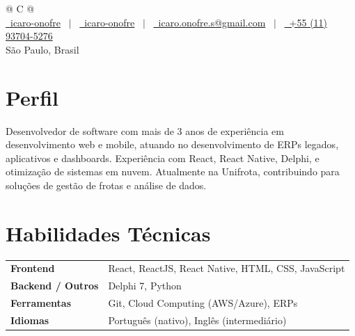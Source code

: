 \documentclass[a4paper,11pt]{article}
\begin{document}
\pagestyle{empty}

\begin{tabularx}{\linewidth}{@{} C @{}}
\fontsize{32}{38} \\[6pt]
\small
\href{https://github.com/icaro-onofre}{\raisebox{-0.05\height}\faGithub\ icaro-onofre} \
$|$ \
\href{https://linkedin.com/in/icaro-onofre}{\raisebox{-0.05\height}\faLinkedin\ icaro-onofre} \
$|$ \
\href{mailto:icaro.onofre.s@gmail.com}{\raisebox{-0.05\height}\faEnvelope\ icaro.onofre.s@gmail.com} \
$|$ \
\href{tel:+5511937045276}{\raisebox{-0.05\height}\faMobile\ +55 (11) 93704-5276} \\[4pt]
\small\color{medgray} São Paulo, Brasil
\end{tabularx}

\vspace{4pt}

\section{Perfil}

Desenvolvedor de software com mais de 3 anos de experiência em desenvolvimento web e mobile, atuando no desenvolvimento de ERPs legados, aplicativos e dashboards. Experiência com React, React Native, Delphi, e otimização de sistemas em nuvem. Atualmente na Unifrota, contribuindo para soluções de gestão de frotas e análise de dados.

\section{Habilidades Técnicas}

\begin{tabularx}{\linewidth}{@{}l X@{}}
\textbf{Frontend} & React, ReactJS, React Native, HTML, CSS, JavaScript \\[3pt]
\textbf{Backend / Outros} & Delphi 7, Python \\[3pt]
\textbf{Ferramentas} & Git, Cloud Computing (AWS/Azure), ERPs \\[3pt]
\textbf{Idiomas} & Português (nativo), Inglês (intermediário) \\
\end{tabularx}
\end{document}
